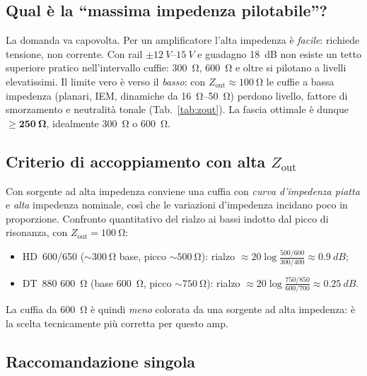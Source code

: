 \subsection{Qual è la ``massima impedenza pilotabile''?}
La domanda va capovolta. Per un amplificatore l'alta impedenza è
\emph{facile}: richiede tensione, non corrente. Con rail $\pm\SIrange{12}{15}{V}$
e guadagno \SI{18}{dB} non esiste un tetto superiore pratico
nell'intervallo cuffie: \SI{300}{\ohm}, \SI{600}{\ohm} e oltre si pilotano
a livelli elevatissimi. Il limite vero è verso il \emph{basso}: con
$Z_{\text{out}}\approx\SI{100}{\ohm}$ le cuffie a bassa impedenza
(planari, IEM, dinamiche da \SIrange{16}{50}{\ohm}) perdono livello,
fattore di smorzamento e neutralità tonale (Tab.~\ref{tab:zout}). La
fascia ottimale è dunque \textbf{$\boldsymbol{\ge\SI{250}{\ohm}}$},
idealmente \SI{300}{\ohm} o \SI{600}{\ohm}.

\subsection{Criterio di accoppiamento con alta \texorpdfstring{$Z_{\text{out}}$}{Zout}}
Con sorgente ad alta impedenza conviene una cuffia con \emph{curva
d'impedenza piatta} e \emph{alta} impedenza nominale, così che le
variazioni d'impedenza incidano poco in proporzione. Confronto
quantitativo del rialzo ai bassi indotto dal picco di risonanza, con
$Z_{\text{out}}=\SI{100}{\ohm}$:
\begin{itemize}
  \item HD~600/650 ($\sim\SI{300}{\ohm}$ base, picco $\sim\SI{500}{\ohm}$):
        rialzo $\approx 20\log\!\frac{500/600}{300/400}\approx\SI{+0.9}{dB}$;
  \item DT~880 \SI{600}{\ohm} (base \SI{600}{\ohm}, picco $\sim\SI{750}{\ohm}$):
        rialzo $\approx 20\log\!\frac{750/850}{600/700}\approx\SI{+0.25}{dB}$.
\end{itemize}
La cuffia da \SI{600}{\ohm} è quindi \emph{meno} colorata da una sorgente
ad alta impedenza: è la scelta tecnicamente più corretta per questo amp.

\subsection{Raccomandazione singola}
\begin{center}\end{center}

